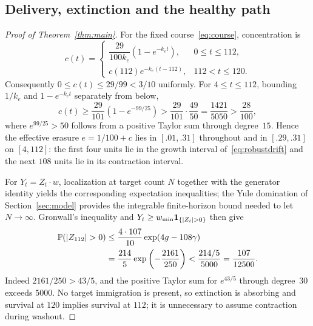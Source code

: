 \subsection{Delivery, extinction and the healthy path}
\begin{proof}[Proof of Theorem~\ref{thm:main}]
For the fixed course~\eqref{eq:course}, concentration is
\begin{equation}\label{eq:concentration}
 c(t)=\begin{cases}
 \dfrac{29}{100k_e}(1-e^{-k_et}),&0\le t\le112,\\[4pt]
 c(112)e^{-k_e(t-112)},&112<t\le120.
 \end{cases}
\end{equation}
Consequently $0\le c(t)\le29/99<3/10$ uniformly. For $4\le t\le112$, bounding $1/k_e$ and $1-e^{-k_et}$ separately from below,
\begin{equation}\label{eq:band}
 c(t)\ge\frac{29}{101}\left(1-e^{-99/25}\right)
 >\frac{29}{101}\cdot\frac{49}{50}=\frac{1421}{5050}>\frac{28}{100},
\end{equation}
where $e^{99/25}>50$ follows from a positive Taylor sum through degree~$15$. Hence the effective erasure $e=1/100+c$ lies in $[.01,.31]$ throughout and in $[.29,.31]$ on $[4,112]$: the first four units lie in the growth interval of~\eqref{eq:robustdrift} and the next $108$ units lie in its contraction interval.

For $Y_t=Z_t\cdot w$, localization at target count $N$ together with the generator identity yields the corresponding expectation inequalities; the Yule domination of Section~\ref{sec:model} provides the integrable finite-horizon bound needed to let $N\to\infty$. Gronwall's inequality and $Y_t\ge w_{\min}\1_{\{|Z_t|>0\}}$ then give
\begin{align}\label{eq:targetproof}
 \Prob(|Z_{112}|>0)
 &\le\frac{4\cdot107}{10}\exp(4g-108\gamma)\nonumber\\
 &=\frac{214}{5}\exp\left(-\frac{2161}{250}\right)
 <\frac{214/5}{5000}=\frac{107}{12500}.
\end{align}
Indeed $2161/250>43/5$, and the positive Taylor sum for $e^{43/5}$ through degree~$30$ exceeds $5000$. No target immigration is present, so extinction is absorbing and survival at $120$ implies survival at $112$; it is unnecessary to assume contraction during washout.


\end{proof}
